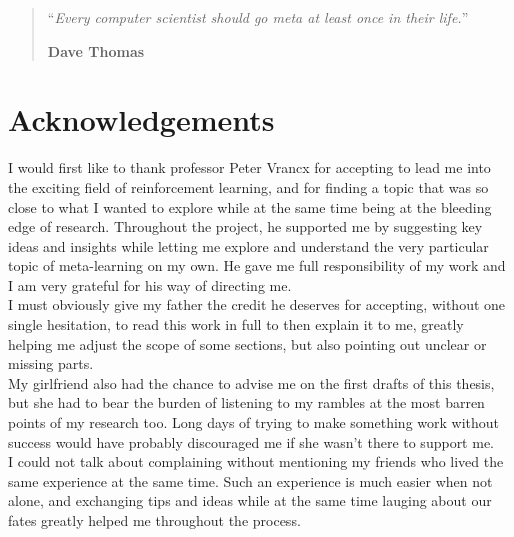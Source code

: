\documentclass[11pt,a4paper,oneside]{book}
\begin{document}

\begin{quotation}
\noindent ``\emph{Every computer scientist should go meta at least once in
	their life.}''
\begin{flushright}\textbf{Dave Thomas}\end{flushright}
\end{quotation}

\medskip


\chapter*{Acknowledgements}
\thispagestyle{empty} 

\noindent I would first like to thank professor Peter Vrancx for accepting
to lead me into the exciting field of reinforcement learning, and for finding
a topic that was so close to what I wanted to explore while at the same
time being at the bleeding edge of research. Throughout the project, he
supported me by suggesting key ideas and insights while letting me explore
and understand the very particular topic of meta-learning on my own. He
gave me full responsibility of my work and I am very grateful for his way 
of directing me.\\

I must obviously give my father the credit he deserves for accepting, without
one single hesitation, to read this work in full to then explain it to me,
greatly helping me adjust the scope of some sections, but also pointing out
unclear or missing parts.\\

My girlfriend also had the chance to advise me on the first drafts of this 
thesis, but she had to bear the burden of listening to my rambles at
the most barren points of my research too. Long days of trying to make something
work without success would have probably discouraged me if she wasn't there
to support me.\\

I could not talk about complaining without mentioning my friends who lived the
same experience at the same time. Such an experience is much easier when not
alone, and exchanging tips and ideas while at the same time lauging about
our fates greatly helped me throughout the process.\\
\end{document}
